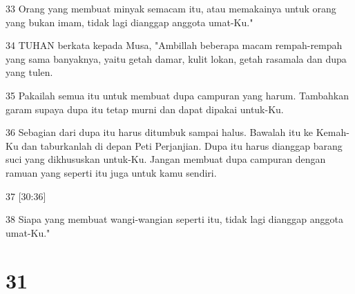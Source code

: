 \par 33 Orang yang membuat minyak semacam itu, atau memakainya untuk orang yang bukan imam, tidak lagi dianggap anggota umat-Ku."
\par 34 TUHAN berkata kepada Musa, "Ambillah beberapa macam rempah-rempah yang sama banyaknya, yaitu getah damar, kulit lokan, getah rasamala dan dupa yang tulen.
\par 35 Pakailah semua itu untuk membuat dupa campuran yang harum. Tambahkan garam supaya dupa itu tetap murni dan dapat dipakai untuk-Ku.
\par 36 Sebagian dari dupa itu harus ditumbuk sampai halus. Bawalah itu ke Kemah-Ku dan taburkanlah di depan Peti Perjanjian. Dupa itu harus dianggap barang suci yang dikhususkan untuk-Ku. Jangan membuat dupa campuran dengan ramuan yang seperti itu juga untuk kamu sendiri.
\par 37 [30:36]
\par 38 Siapa yang membuat wangi-wangian seperti itu, tidak lagi dianggap anggota umat-Ku."

\chapter{31}

